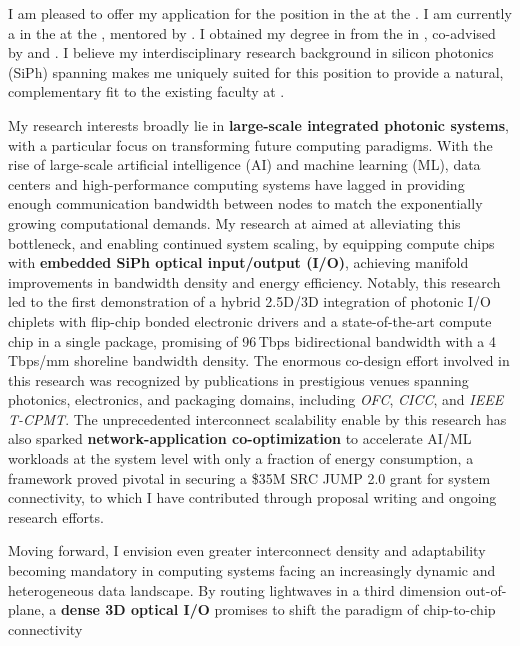 I am pleased to offer my application for the \appPosition{} position \appJobID{} in the \appDept{} at the \appSchool{}. I am currently a \myTitle{} in the \myDept{} at the \mySchoolShort{}, mentored by \mySuper{}. I obtained my \myDegree{} degree in \myMajor{} from the \myPhDSchool{} in \myPhDYear{}, co-advised by \myAdvisor{} and \myCoAdvisor{}. I believe my interdisciplinary research background in silicon photonics (SiPh) spanning \appArea{} makes me uniquely suited for this position to provide a natural, complementary fit to the existing faculty at \appSchoolDeptShort{}.

My research interests broadly lie in \textbf{large-scale integrated photonic systems}, with a particular focus on transforming future computing paradigms. With the rise of large-scale artificial intelligence (AI) and machine learning (ML), data centers and high-performance computing systems have lagged in providing enough communication bandwidth between nodes to match the exponentially growing computational demands. My research at \mySchoolShort{} aimed at alleviating this bottleneck, and enabling continued system scaling, by equipping compute chips with \textbf{embedded SiPh optical input/output (I/O)}, achieving manifold improvements in bandwidth density and energy efficiency. Notably, this research led to the first demonstration of a hybrid 2.5D/3D integration of photonic I/O chiplets with flip-chip bonded electronic drivers and a state-of-the-art compute chip in a single package, promising of 96\,Tbps bidirectional bandwidth with a 4\,Tbps/mm shoreline bandwidth density. The enormous co-design effort involved in this research was recognized by publications in prestigious venues spanning photonics, electronics, and packaging domains, including \emph{OFC}, \emph{CICC}, and \emph{IEEE T-CPMT}. The unprecedented interconnect scalability enable by this research has also sparked \textbf{network-application co-optimization} to accelerate AI/ML workloads at the system level with only a fraction of energy consumption, a framework proved pivotal in securing a \$35M SRC JUMP 2.0 grant for system connectivity, to which I have contributed through proposal writing and ongoing research efforts.

Moving forward, I envision even greater interconnect density and adaptability becoming mandatory in computing systems facing an increasingly dynamic and heterogeneous data landscape. By routing lightwaves in a third dimension out-of-plane, a \textbf{dense 3D optical I/O} promises to shift the paradigm of chip-to-chip connectivity

